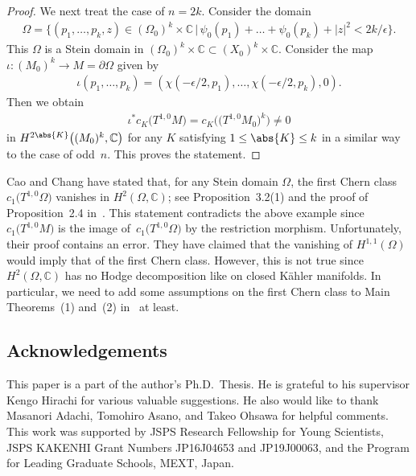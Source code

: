 \documentclass[pdftex]{sigma}
\numberwithin{equation}{section}
\begin{document}
\begin{proof}
We next treat the case of $n = 2 k$. Consider the domain
\begin{gather*}
\Omega= \big\{(p_{1}, \dots , p_{k}, z) \in (\Omega_{0})^{k} \times \mathbb{C}\,\big|\, \psi_{0}(p_{1}) + \dots + \psi_{0}(p_{k}) + |z|^{2} < 2 k / \epsilon\big\}.
\end{gather*}
This $\Omega$ is a Stein domain in $(\Omega_{0})^{k} \times \mathbb{C} \subset (X_{0})^{k} \times \mathbb{C}$.
Consider the map $\iota \colon (M_{0})^{k} \to M = \partial \Omega$ given by
\begin{gather*}
\iota(p_{1}, \dots , p_{k})= (\chi(- \epsilon / 2, p_{1}), \dots , \chi(- \epsilon / 2, p_{k}), 0).
\end{gather*}
Then we obtain
\begin{gather*}
\iota^{*} c_{K}\big(T^{1,0}M\big)= c_{K}\big(\big(T^{1, 0} M_{0}\big)^{k}\big) \neq 0
\end{gather*}
in $H^{2 \abs{K}}\big((M_{0})^{k}, \mathbb{C}\big)$ for any $K$ satisfying $1 \leq \abs{K} \leq k$ in a similar way to the case of odd~$n$. This proves the statement.
\end{proof}

\begin{Remark}Cao and Chang have stated that, for any Stein domain $\Omega$, the first Chern class $c_{1}\big(T^{1,0}\Omega\big)$ vanishes in $H^{2}(\Omega, \mathbb{C})$; see Proposition~3.2(1) and the proof of Proposition~2.4 in~\cite{Cao-Chang07}. This statement contradicts the above example since $c_{1}\big(T^{1,0}M\big)$ is the image of~$c_{1}\big(T^{1,0}\Omega\big)$ by the restriction morphism. Unfortunately, their proof contains an error. They have claimed that the vanishing of $H^{1, 1}(\Omega)$ would imply that of the first Chern class. However, this is not true since $H^{2}(\Omega, \mathbb{C})$ has no Hodge decomposition like on closed K\"{a}hler manifolds. In particular, we need to add some assumptions on the first Chern class to Main Theorems~(1) and~(2) in~\cite{Cao-Chang07} at least.
\end{Remark}

\subsection*{Acknowledgements}
This paper is a part of the author's Ph.D.~Thesis. He is grateful to his supervisor Kengo Hirachi for various valuable suggestions. He also would like to thank Masanori Adachi, Tomohiro Asano, and Takeo Ohsawa for helpful comments. This work was supported by JSPS Research Fellowship for Young Scientists, JSPS KAKENHI Grant Numbers JP16J04653 and JP19J00063, and the Program for Leading Graduate Schools, MEXT, Japan.
\end{document}
